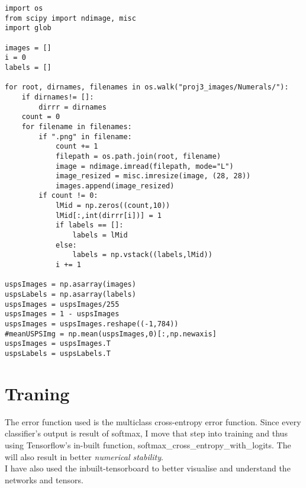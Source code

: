 \documentclass[a4paper,11pt]{article}
\begin{document}
\begin{lstlisting}[label={list:second}]
import os
from scipy import ndimage, misc
import glob

images = []
i = 0   
labels = []

for root, dirnames, filenames in os.walk("proj3_images/Numerals/"):
	if dirnames!= []:
		dirrr = dirnames
	count = 0
	for filename in filenames:
		if ".png" in filename:
			count += 1
			filepath = os.path.join(root, filename)
			image = ndimage.imread(filepath, mode="L")
			image_resized = misc.imresize(image, (28, 28))
			images.append(image_resized)
		if count != 0:
			lMid = np.zeros((count,10))
			lMid[:,int(dirrr[i])] = 1
			if labels == []:
				labels = lMid
			else:
				labels = np.vstack((labels,lMid))
			i += 1
			
uspsImages = np.asarray(images)
uspsLabels = np.asarray(labels)
uspsImages = uspsImages/255
uspsImages = 1 - uspsImages
uspsImages = uspsImages.reshape((-1,784))
#meanUSPSImg = np.mean(uspsImages,0)[:,np.newaxis]
uspsImages = uspsImages.T
uspsLabels = uspsLabels.T
\end{lstlisting}

\section*{Traning}

The error function used is the multiclass cross-entropy error function.
Since every classifier's output is result of softmax, I move that step into training and thus using Tensorflow's in-built function, softmax\_cross\_entropy\_with\_logits. The will also result in better \textit{numerical stability}.\\
I have also used the inbuilt-tensorboard to better visualise and understand the networks and tensors.
\end{document}

